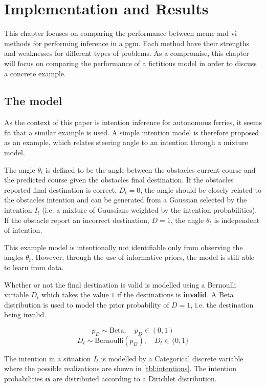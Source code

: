 \chapter{Implementation and Results}

This chapter focuses on comparing the performance between \acrshort{mcmc} and \acrshort{vi} methods for performing inference in a \acrshort{pgm}. Each method have their strengths and weaknesses for different types of problems. As a compromise, this chapter will focus on comparing the performance of a fictitious model in order to discuss a concrete example.  

\section{The model}
As the context of this paper is intention inference for autonomous ferries, it seems fit that a similar example is used. A simple intention model is therefore proposed as an example, which relates steering angle to an intention through a mixture model. 

The angle $\theta_t$ is defined to be the angle between the obstacles current course and the predicted course given the obstacles final destination. If the obstacles reported final destination is correct, $D_t=0$, the angle should be closely related to the obstacles intention and can be generated from a Gaussian selected by the intention $I_t$ (i.e. a mixture of Gaussians weighted by the intention probabilities). If the obstacle report an incorrect destination, $D=1$, the angle $\theta_t$ is independent of intention.

This example model is intentionally not identifiable only from observing the angles $\theta_t$. However, through the use of informative priors, the model is still able to learn from data. 

Whether or not the final destination is valid is modelled using a Bernoulli variable $D_t$ which takes the value $1$ if the destinations is \textbf{invalid}. A Beta distribution is used to model the prior probability of $D=1$, i.e. the destination being invalid.  

\begin{equation}
    p_D \sim \text{Beta}, \quad p_D \in (0, 1)
\end{equation}
\begin{equation}
    D_t \sim \text{Bernoulli}(p_D), \quad D_t \in \{0, 1\}
\end{equation}

The intention in a situation $I_t$ is modelled by a Categorical discrete variable where the possible realizations are shown in \cref{tbl:intentions}. The intention probabilities $\boldsymbol{\alpha}$ are distributed according to a Dirichlet distribution.

